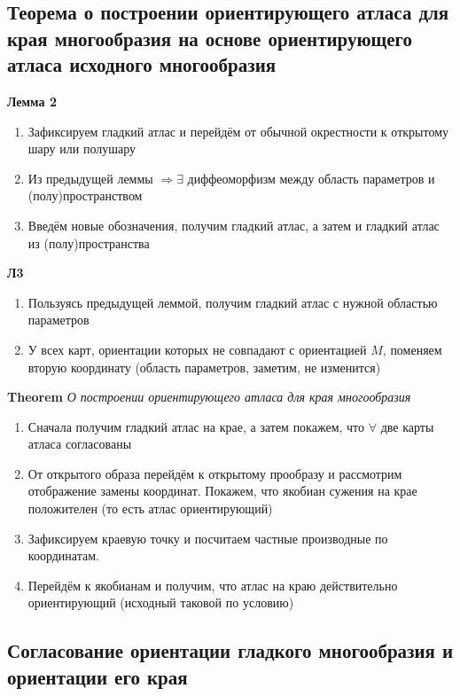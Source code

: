 \documentclass[a4paper, 14pt]{article}
\begin{document}
    \subsection{Теорема о построении ориентирующего атласа для края многообразия на основе ориентирующего атласа
    исходного многообразия}
    
    \textbf{Лемма 2}
    
    \begin{enumerate}
        \item Зафиксируем гладкий атлас и перейдём от обычной окрестности к открытому шару или полушару
        \item Из предыдущей леммы $\Rightarrow \exists$ диффеоморфизм между область параметров и (полу)пространством
        \item Введём новые обозначения, получим гладкий атлас, а затем и гладкий атлас из (полу)пространства
    \end{enumerate}
    
    \textbf{Л3}
    
    \begin{enumerate}
        \item Пользуясь предыдущей леммой, получим гладкий атлас с нужной областью параметров
        \item У всех карт, ориентации которых не совпадают с ориентацией $M$, поменяем вторую координату (область
        параметров, заметим, не изменится)
    \end{enumerate}
    
    \textbf{Theorem} \textit{О построении ориентирующего атласа для края многообразия}
    
    \begin{enumerate}
        \item Сначала получим гладкий атлас на крае, а затем покажем, что $\forall$ две карты атласа согласованы
        \item От открытого образа перейдём к открытому прообразу и рассмотрим отображение замены координат.
        Покажем, что якобиан сужения на крае положителен (то есть атлас ориентирующий)
        \item Зафиксируем краевую точку и посчитаем частные производные по координатам.
        \item Перейдём к якобианам и получим, что атлас на краю действительно ориентирующий (исходный таковой по условию)
    \end{enumerate}
    
    \subsection{Согласование ориентации гладкого многообразия и ориентации его края}
    
\end{document}
